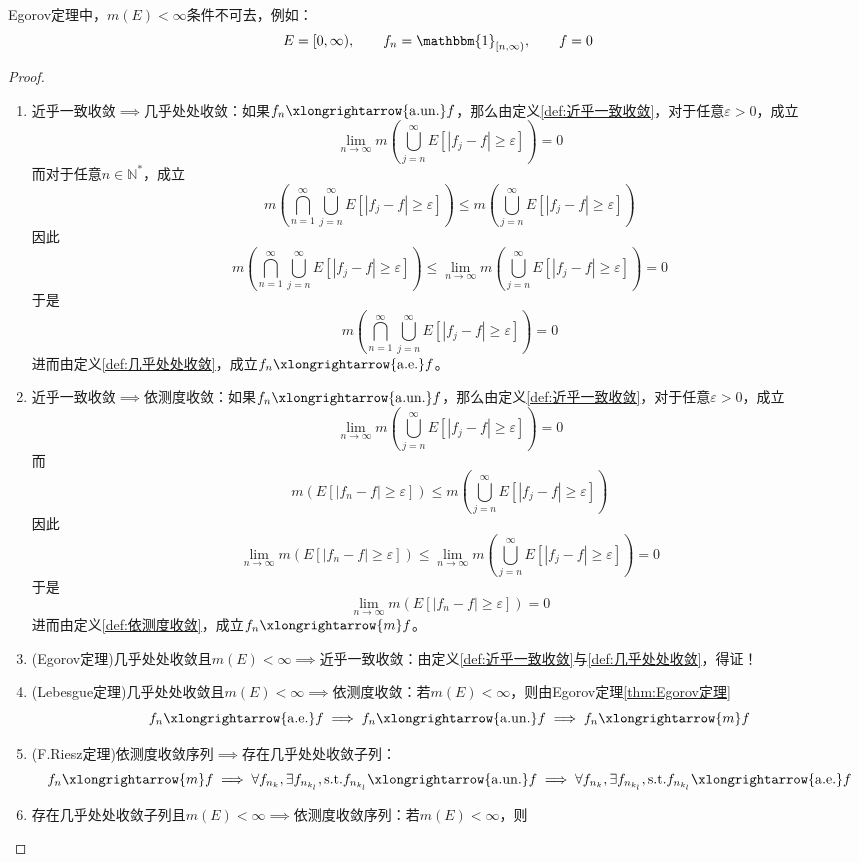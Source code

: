 \documentclass[lang = cn, scheme = chinese, thmcnt = section]{elegantbook}
\newcommand{\N}{\mathbb{N}}            %
\newcommand{\toae}{\xlongrightarrow{\mathrm{a.e.}}}
\newcommand{\toaun}{\xlongrightarrow{\mathrm{a.un.}}}
\newcommand{\tom}{\xlongrightarrow{m}}
\begin{document}
\begin{remark}
	Egorov定理中，$m(E)<\infty$条件不可去，例如：
	$$
	E=[0,\infty),\qquad 
	f_n=\mathbbm{1}_{[n,\infty)},\qquad 
	f=0
	$$
\end{remark}

\begin{proof}
	\begin{enumerate}
		\item 近乎一致收敛$\implies$几乎处处收敛：如果$f_n\toaun f$，那么由定义\ref{def:近乎一致收敛}，对于任意$\varepsilon>0$，成立
		$$
		\lim_{n\to\infty}m\left(\bigcup_{j=n}^{\infty}E[|f_j-f|\ge \varepsilon]\right)=0
		$$
		而对于任意$n\in\N^*$，成立
		$$
		m\left(\bigcap_{n=1}^{\infty}\bigcup_{j=n}^{\infty}E[|f_j-f|\ge \varepsilon]\right)\le m\left(\bigcup_{j=n}^{\infty}E[|f_j-f|\ge \varepsilon]\right)
		$$
		因此
		$$
		m\left(\bigcap_{n=1}^{\infty}\bigcup_{j=n}^{\infty}E[|f_j-f|\ge \varepsilon]\right)\le \lim_{n\to\infty}m\left(\bigcup_{j=n}^{\infty}E[|f_j-f|\ge \varepsilon]\right)=0
		$$
		于是
		$$
		m\left(\bigcap_{n=1}^{\infty}\bigcup_{j=n}^{\infty}E[|f_j-f|\ge \varepsilon]\right)=0
		$$
		进而由定义\ref{def:几乎处处收敛}，成立$f_n\toae f$。
		\item 近乎一致收敛$\implies$依测度收敛：如果$f_n\toaun f$，那么由定义\ref{def:近乎一致收敛}，对于任意$\varepsilon>0$，成立
		$$
		\lim_{n\to\infty}m\left(\bigcup_{j=n}^{\infty}E[|f_j-f|\ge \varepsilon]\right)=0
		$$
		而%
		$$
		m\left(E[|f_n-f|\ge \varepsilon]\right)
		\le m\left(\bigcup_{j=n}^{\infty}E[|f_j-f|\ge \varepsilon]\right)
		$$
		因此%
		$$
		\lim_{n\to\infty}m\left(E[|f_n-f|\ge \varepsilon]\right)\le
		\lim_{n\to\infty}m\left(\bigcup_{j=n}^{\infty}E[|f_j-f|\ge \varepsilon]\right)=0
		$$
		于是%
		$$
		\lim_{n\to\infty}m\left(E[|f_n-f|\ge \varepsilon]\right)=0
		$$
		进而由定义\ref{def:依测度收敛}，成立$f_n\tom f$。
		\item (Egorov定理)几乎处处收敛且$m(E)<\infty\implies$近乎一致收敛：由定义\ref{def:近乎一致收敛}与\ref{def:几乎处处收敛}，得证！
		\item (Lebesgue定理)几乎处处收敛且$m(E)<\infty\implies$依测度收敛：若$m(E)<\infty$，则由Egorov定理\ref{thm:Egorov定理}
		$$
		f_n\toae f\implies f_n\toaun f \implies f_n\tom f
		$$
		\item (F.Riesz定理)依测度收敛序列$\implies$存在几乎处处收敛子列：
		$$
		f_n\tom f\implies
		\forall f_{n_k},\exists f_{n_{k_l}},\text{s.t.}f_{n_{k_l}}\toaun f \implies
		\forall f_{n_k},\exists f_{n_{k_l}},\text{s.t.}f_{n_{k_l}}\toae f
		$$
		\item 存在几乎处处收敛子列且$m(E)<\infty\implies$依测度收敛序列：若$m(E)<\infty$，则

\end{enumerate}
\end{proof}
\end{document}

